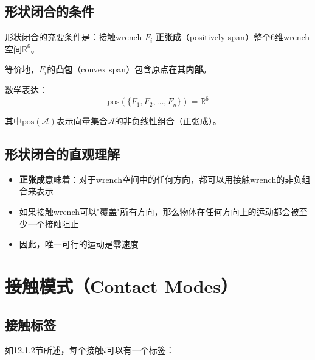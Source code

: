 \documentclass[12pt,a4paper]{article}
\begin{document}
\subsection{形状闭合的条件}

形状闭合的充要条件是：接触wrench $F_i$ \textbf{正张成}（positively span）整个6维wrench空间$\mathbb{R}^6$。

等价地，$F_i$的\textbf{凸包}（convex span）包含原点在其\textbf{内部}。

数学表达：
\begin{equation}
\text{pos}(\{F_1, F_2, \ldots, F_n\}) = \mathbb{R}^6
\label{eq:form_closure_condition}
\end{equation}

其中$\text{pos}(\mathcal{A})$表示向量集合$\mathcal{A}$的非负线性组合（正张成）。

\subsection{形状闭合的直观理解}

\begin{itemize}
\item \textbf{正张成}意味着：对于wrench空间中的任何方向，都可以用接触wrench的非负组合来表示
\item 如果接触wrench可以"覆盖"所有方向，那么物体在任何方向上的运动都会被至少一个接触阻止
\item 因此，唯一可行的运动是零速度
\end{itemize}

\section{接触模式（Contact Modes）}

\subsection{接触标签}

如12.1.2节所述，每个接触$i$可以有一个标签：
\end{document}
